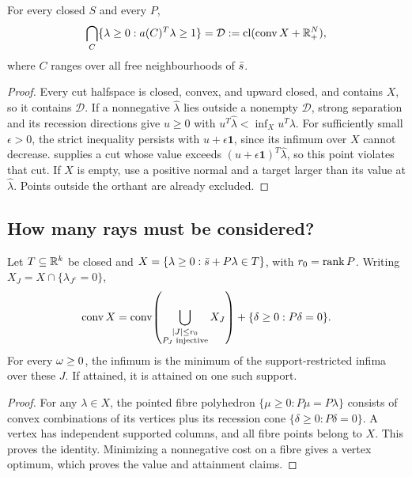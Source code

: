 \begin{theorem}\label{fd:dominant}
For every closed $S$ and every $P$,
\[
 \bigcap_C\{\lambda\ge0:a(C)^T\lambda\ge1\}
 =\mathcal D:=\operatorname{cl}(\operatorname{conv} X+\mathbb R_+^N),
\]
where $C$ ranges over all free neighbourhoods of $\bar s$.
\end{theorem}
\begin{proof}
Every cut halfspace is closed, convex, and upward closed, and contains
$X$, so it contains $\mathcal D$. If a nonnegative $\widehat\lambda$
lies outside a nonempty $\mathcal D$, strong separation and its
recession directions give $u\ge0$ with
$u^T\widehat\lambda<\inf_Xu^T\lambda$.
For sufficiently small $\epsilon>0$, the strict inequality persists
with $u+\epsilon\mathbf1$, since its infimum over $X$ cannot decrease.
 supplies a cut whose value exceeds
$(u+\epsilon\mathbf1)^T\widehat\lambda$, so this point violates that cut.
If $X$ is empty, use a positive normal and a target larger than its value
at $\widehat\lambda$. Points outside the orthant are already excluded.
\end{proof}

\subsection{How many rays must be considered?}

\begin{lemma}\label{fd:rank-support}
Let $T\subseteq\mathbb R^k$ be closed and
$X=\{\lambda\ge0:\bar s+P\lambda\in T\}$, with $r_0=\operatorname{rank} P$.
Writing $X_J=X\cap\{\lambda_{J^c}=0\}$,
\[
 \operatorname{conv} X=\operatorname{conv}\!\left(\bigcup_{\substack{|J|\le r_0\\P_J\text{ injective}}}
 X_J\right)+\{\delta\ge0:P\delta=0\}.
\]
For every $\omega\ge0$, the infimum is the minimum of the support-restricted
infima over these $J$. If attained, it is attained on one such support.
\end{lemma}
\begin{proof}
For any $\lambda\in X$, the pointed fibre polyhedron
$\{\mu\ge0:P\mu=P\lambda\}$ consists of convex combinations of its
vertices plus its recession cone $\{\delta\ge0:P\delta=0\}$.
A vertex has independent supported columns, and all fibre points belong
to $X$. This proves the identity. Minimizing a nonnegative cost on a
fibre gives a vertex optimum, which proves the value and attainment claims.
\end{proof}

